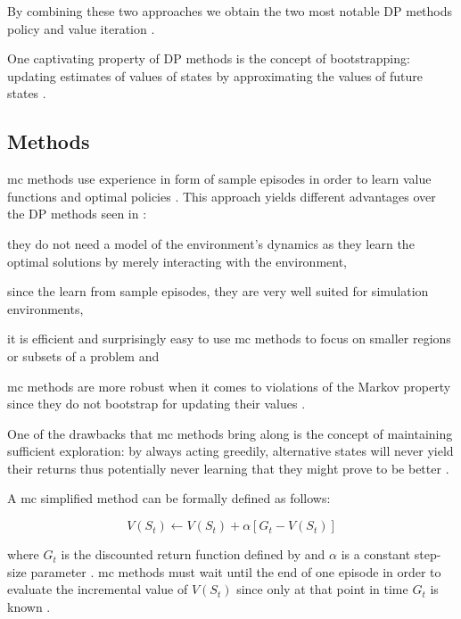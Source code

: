 \documentclass{seal_thesis}
\begin{document}
By combining these two approaches we obtain the two most notable DP methods \ie policy and value iteration \cite[p. 95]{Sutton2017}.

One captivating property of DP methods is the concept of bootstrapping: updating estimates of values of states by approximating the values of future states \cite[p. 96]{Sutton2017}.

\subsection{ Methods}
\label{subsec:mc}

\gls{mc} methods use experience in form of sample episodes in order to learn value functions and optimal policies \cite[p. 123]{Sutton2017}. This approach yields different advantages over the DP methods seen in :
\begin{enumerate*}
	\item they do not need a model of the environment's dynamics as they learn the optimal solutions by merely interacting with the environment,
	\item since the learn from sample episodes, they are very well suited for simulation environments,
	\item it is efficient and surprisingly easy to use \gls{mc} methods to focus on smaller regions or subsets of a problem and
	\item \gls{mc} methods are more robust when it comes to violations of the Markov property since they do not bootstrap for updating their values \cite[p. 123]{Sutton2017}.
\end{enumerate*}

One of the drawbacks that \gls{mc} methods bring along is the concept of maintaining sufficient exploration: by always acting greedily, alternative states will never yield their returns thus potentially never learning that they might prove to be better \cite[p. 123]{Sutton2017}.

A \gls{mc} simplified method can be formally defined as follows:

\begin{equation}
\label{eq:mc_update}
	V(S_t) \leftarrow V(S_t) + \alpha [G_t - V(S_t)]
\end{equation}

where $G_t$ is the discounted return function defined by  and $\alpha$ is a constant step-size parameter \cite[p. 127]{Sutton2017}. \gls{mc} methods must wait until the end of one episode in order to evaluate the incremental value of $V(S_t)$ since only at that point in time $G_t$ is known \cite[p. 128]{Sutton2017}.
\end{document}
